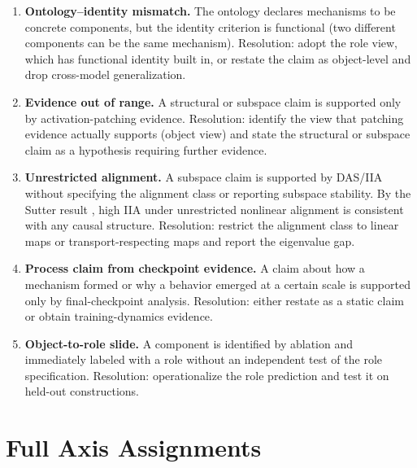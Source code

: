 \documentclass{article}
\begin{document}
\begin{enumerate}[leftmargin=*, label=(\arabic*)]

\item \textbf{Ontology--identity mismatch.}  The ontology declares
      mechanisms to be concrete components, but the identity criterion is
      functional (two different components can be the same mechanism).
      Resolution: adopt the role view, which has functional identity built
      in, or restate the claim as object-level and drop cross-model
      generalization.

\item \textbf{Evidence out of range.}  A structural or subspace claim
      is supported only by activation-patching evidence.  Resolution:
      identify the view that patching evidence actually supports (object
      view) and state the structural or subspace claim as a hypothesis
      requiring further evidence.

\item \textbf{Unrestricted alignment.}  A subspace claim is supported
      by DAS/IIA without specifying the alignment class or reporting
      subspace stability.  By the Sutter result \citep{sutter2025}, high
      IIA under unrestricted nonlinear alignment is consistent with any
      causal structure.  Resolution: restrict the alignment class to
      linear maps or transport-respecting maps and report the eigenvalue gap.

\item \textbf{Process claim from checkpoint evidence.}  A claim about
      how a mechanism formed or why a behavior emerged at a certain scale
      is supported only by final-checkpoint analysis.  Resolution: either
      restate as a static claim or obtain training-dynamics evidence.

\item \textbf{Object-to-role slide.}  A component is identified by
      ablation and immediately labeled with a role without an independent
      test of the role specification.  Resolution: operationalize the role
      prediction and test it on held-out constructions.

\end{enumerate}

\section{Full Axis Assignments}\label{app:axes}
\end{document}
